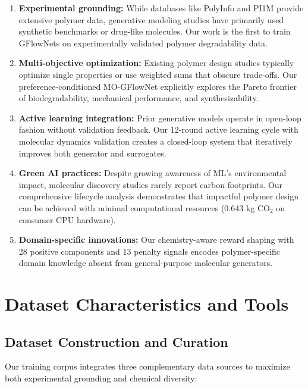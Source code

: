 \documentclass[twocolumn,10pt]{article}
\begin{document}
\begin{enumerate}[noitemsep,leftmargin=*]
\item \textbf{Experimental grounding:} While databases like PolyInfo and PI1M provide extensive polymer data, generative modeling studies have primarily used synthetic benchmarks or drug-like molecules. Our work is the first to train GFlowNets on experimentally validated polymer degradability data.

\item \textbf{Multi-objective optimization:} Existing polymer design studies typically optimize single properties or use weighted sums that obscure trade-offs. Our preference-conditioned MO-GFlowNet explicitly explores the Pareto frontier of biodegradability, mechanical performance, and synthesizability.

\item \textbf{Active learning integration:} Prior generative models operate in open-loop fashion without validation feedback. Our 12-round active learning cycle with molecular dynamics validation creates a closed-loop system that iteratively improves both generator and surrogates.

\item \textbf{Green AI practices:} Despite growing awareness of ML's environmental impact, molecular discovery studies rarely report carbon footprints. Our comprehensive lifecycle analysis demonstrates that impactful polymer design can be achieved with minimal computational resources (0.643 kg CO$_2$ on consumer CPU hardware).

\item \textbf{Domain-specific innovations:} Our chemistry-aware reward shaping with 28 positive components and 13 penalty signals encodes polymer-specific domain knowledge absent from general-purpose molecular generators.
\end{enumerate}

\section{Dataset Characteristics and Tools}

\subsection{Dataset Construction and Curation}

Our training corpus integrates three complementary data sources to maximize both experimental grounding and chemical diversity:
\end{document}
